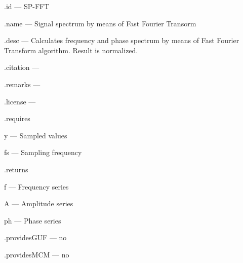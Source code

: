 \begin{tightdesc}
\item [\textsf{.id}] --- SP-FFT
\item [\textsf{.name}] --- Signal spectrum by means of Fast Fourier Transorm
\item [\textsf{.desc}] --- Calculates frequency and phase spectrum by means of Fast Fourier Transform algorithm. Result is normalized.
\item [\textsf{.citation}] --- 
\item [\textsf{.remarks}] --- 
\item [\textsf{.license}] --- 
\item [\textsf{.requires}] \rule{0em}{0em}
\begin{tightdesc}
\item [\textsf{y}] --- Sampled values
\item [\textsf{fs}] --- Sampling frequency
\end{tightdesc}
\item [\textsf{.returns}] \rule{0em}{0em}
\begin{tightdesc}
\item [\textsf{f}] --- Frequency series
\item [\textsf{A}] --- Amplitude series
\item [\textsf{ph}] --- Phase series
\end{tightdesc}
\item [\textsf{.providesGUF}] --- no
\item [\textsf{.providesMCM}] ---  no
\end{tightdesc}

